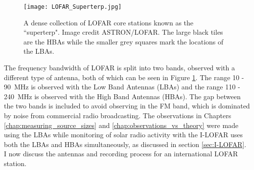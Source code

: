  
\begin{figure}[ht]
\centering
\texttt{[image: LOFAR\_Superterp.jpg]}
\caption[The LOFAR superterp.]{A dense collection of LOFAR core stations known as the ``superterp". Image credit ASTRON/LOFAR. The large black tiles are the HBAs while the smaller grey squares mark the locations of the LBAs.}
\label{fig:superterp}
\end{figure}

The frequency bandwidth of LOFAR is split into two bands, observed with a different type of antenna, both of which can be seen in Figure \ref{fig:superterp}. The range 10 - 90~MHz is observed with the Low Band Antennas (LBAs) and the range 110 - 240~MHz is observed with the High Band Antennas (HBAs). The gap between the two bands is included to avoid observing in the FM band, which is dominated by noise from commercial radio broadcasting. The observations in Chapters \ref{chap:measuring_source_sizes} and \ref{chap:observations_vs_theory} were made using the LBAs while monitoring of solar radio activity with the I-LOFAR uses both the LBAs and HBAs simultaneously, as discussed in section \ref{sec:I-LOFAR}. I now discuss the antennas and recording process for an international LOFAR station.
